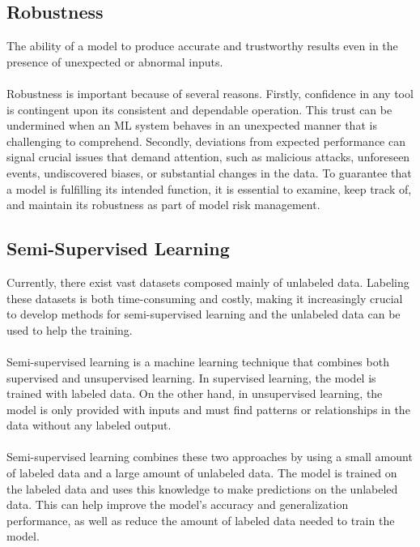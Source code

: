 \documentclass[paper=a4, fontsize=11pt]{scrartcl}
\numberwithin{equation}{section}		%
\numberwithin{figure}{section}			%
\numberwithin{table}{section}				%
\begin{document}
\subsection{Robustness}
The ability of a model to produce accurate and trustworthy results even in the presence of unexpected or abnormal inputs.
\\
\\
Robustness is important because of several reasons. Firstly, confidence in any tool is contingent upon its consistent and dependable operation. This trust can be undermined when an ML system behaves in an unexpected manner that is challenging to comprehend. Secondly, deviations from expected performance can signal crucial issues that demand attention, such as malicious attacks, unforeseen events, undiscovered biases, or substantial changes in the data. To guarantee that a model is fulfilling its intended function, it is essential to examine, keep track of, and maintain its robustness as part of model risk management.

\subsection{Semi-Supervised Learning}
Currently, there exist vast datasets composed mainly of unlabeled data. Labeling these datasets is both time-consuming and costly, making it increasingly crucial to develop methods for semi-supervised learning and the unlabeled data can be used to help the training.
\\
\\
Semi-supervised learning is a machine learning technique that combines both supervised and unsupervised learning. In supervised learning, the model is trained with labeled data. On the other hand, in unsupervised learning, the model is only provided with inputs and must find patterns or relationships in the data without any labeled output.
\\
\\
Semi-supervised learning combines these two approaches by using a small amount of labeled data and a large amount of unlabeled data. The model is trained on the labeled data and uses this knowledge to make predictions on the unlabeled data. This can help improve the model's accuracy and generalization performance, as well as reduce the amount of labeled data needed to train the model.
\end{document}
